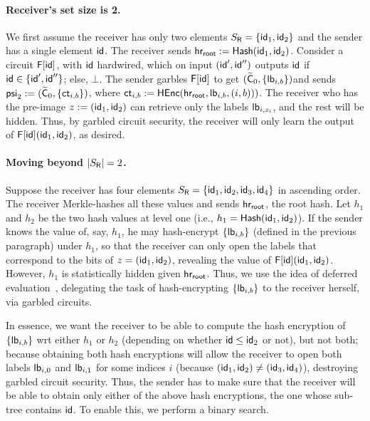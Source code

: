 \paragraph{Receiver's set size is 2.} We first assume the receiver has only two elements $S_{\mathsf{R}} = \{\mathsf{id}_1 , \mathsf{id}_2 \}$ and the sender has a single element $\mathsf{id}$. The receiver sends  $\mathsf{hr_{root}} := \mathsf{Hash}(\mathsf{id}_1, \mathsf{id}_2)$. Consider a circuit $\mathsf{F}[\mathsf{id}]$, with $\mathsf{id}$ hardwired, which on input $(\mathsf{id}', \mathsf{id}'')$ outputs $\mathsf{id}$ if $\mathsf{id} \in \{\mathsf{id}', \mathsf{id}''\}$; else,  $\bot$. The sender garbles $\mathsf{F}[\mathsf{id}]$ to get $(\widetilde{\mathsf{C}}_0,\{ \mathsf{lb}_{i,b}  \})$\footnotemark and sends $\mathsf{psi}_2 := (\widetilde{\mathsf{C}}_0 , \{ \mathsf{ct}_{i,b} \})$, where  $ \mathsf{ct}_{i,b} := \mathsf{HEnc}(\mathsf{hr_{root}} , \mathsf{lb}_{i,b} , (i,b) ))$. The receiver who has the pre-image $z:= (\mathsf{id}_1, \mathsf{id}_2)$ can  retrieve only the labels $\mathsf{lb}_{i,z_i}$, and the rest will be hidden.  Thus, by garbled circuit security, the receiver will only learn the output of $\mathsf{F}[\mathsf{id}](\mathsf{id}_1, \mathsf{id}_2)$, as desired.


\paragraph{Moving beyond  $|S_{\mathsf{R}}| = 2$.} Suppose the receiver has four elements $S_{\mathsf{R}} = \{ \mathsf{id}_1, \mathsf{id}_2, \mathsf{id}_3, \mathsf{id}_4 \}$  in ascending order. The receiver Merkle-hashes all these values and sends $\mathsf{hr_{root}}$, the root hash. Let $h_1$ and $h_2$ be the two hash values at level one (i.e., $h_1 = \mathsf{Hash}(\mathsf{id}_1, \mathsf{id}_2)$). If the sender knows the value of, say, $h_1$, he may hash-encrypt $\{\mathsf{lb}_{i,b} \}$ (defined in the previous paragraph) under $h_1$, so that the receiver can only open the  labels that correspond to the bits of $z = (\mathsf{id}_1, \mathsf{id}_2)$, revealing the value of $\mathsf{F}[\mathsf{id}](\mathsf{id}_1, \mathsf{id}_2)$. However,  $h_1$ is statistically hidden given $\mathsf{hr_{root}}$. Thus, we use the idea of deferred evaluation~\cite{C:DotGar17,C:CDGGMP17,TCC:DotGar17,EC:BLSV18}, delegating  the task of hash-encrypting $\{\mathsf{lb}_{i,b} \}$ to the receiver herself, via  garbled circuits.

In essence, we want the receiver to be able to compute the hash encryption of $\{\mathsf{lb}_{i,b} \}$ wrt either $h_1$ or $h_2$ (depending on whether $\mathsf{id} \leq \mathsf{id}_2$ or not), but not both; because obtaining both hash encryptions will  allow the receiver to open  both labels $\mathsf{lb}_{i,0}$ and $\mathsf{lb}_{i,1}$ for some indices $i$ (because $(\mathsf{id}_1, \mathsf{id}_2) \neq (\mathsf{id}_3, \mathsf{id}_4)$), destroying garbled circuit security. Thus, the sender has to make sure that the receiver will be able to obtain only either of the above hash encryptions, the one whose sub-tree contains $\mathsf{id}$. To enable this, we perform a binary search.


